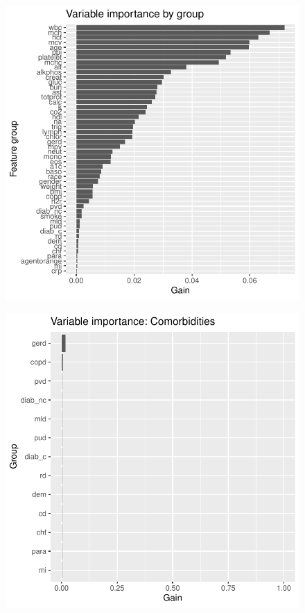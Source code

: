\documentclass[12pt]{article}
\begin{document}
\begin{figure}[h]
\centering
\includegraphics[width=1.0\textwidth]{figures/vi_group.pdf}
\end{figure}
\begin{figure}[h]
\centering
\includegraphics[width=1.0\textwidth]{figures/vi_group_Comorbidities_.pdf}
\end{figure}
\end{document}
